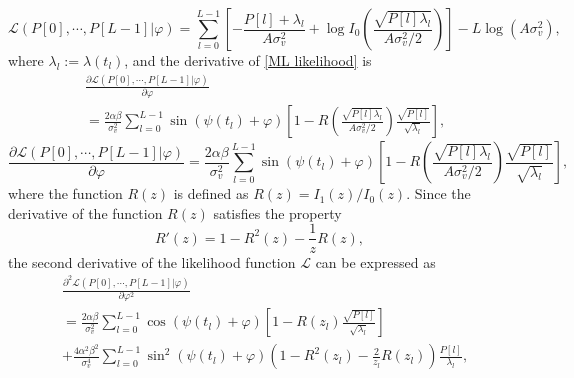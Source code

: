 \documentclass[journal,twocolumn]{IEEEtran}
\theoremstyle{nonumberplain}
\begin{document}
    \else 
        \begin{equation}
            \mathcal{L}(P[0],\cdots,P[L-1] | \varphi) = \sum_{l=0}^{L-1}\left[-\frac{P[l] + \lambda_l}{A\sigma_v^2} + \log I_0\left(\frac{\sqrt{P[l] \lambda_l}}{A\sigma_v^2/2}\right)\right] - L\log(A\sigma_v^2),
            \label{ML likelihood}
        \end{equation}
    \fi
    where $\lambda_l := \lambda(t_l)$, and the derivative of \eqref{ML likelihood} is 
    \ifx\onecol\undefined
        \begin{equation}
            \begin{aligned}
                & \frac{\partial \mathcal{L}(P[0],\cdots,P[L-1] | \varphi)}{\partial \varphi} \\
                &= \frac{2\alpha\beta}{\sigma_v^2}\sum_{l=0}^{L-1}\sin(\psi(t_l)+\varphi) \left[1 - R\left( \frac{\sqrt{P[l]\lambda_l}}{A\sigma_v^2/2} \right) \frac{\sqrt{P[l]}}{\sqrt{\lambda_l}}\right],
            \end{aligned}
            \label{eqn:First Derivative Likelihood}
        \end{equation}
    \else 
        \begin{equation}
            \frac{\partial \mathcal{L}(P[0],\cdots,P[L-1] | \varphi)}{\partial \varphi} = \frac{2\alpha\beta}{\sigma_v^2}\sum_{l=0}^{L-1}\sin(\psi(t_l)+\varphi) \left[1 - R\left( \frac{\sqrt{P[l]\lambda_l}}{A\sigma_v^2/2} \right) \frac{\sqrt{P[l]}}{\sqrt{\lambda_l}}\right],
            \label{eqn:First Derivative Likelihood}
        \end{equation}
    \fi
    where the function $R(z)$ is defined as $R(z) = I_1(z)/I_0(z)$. Since the derivative of the function $R(z)$ satisfies the property \cite{silverman1972special}
    \begin{equation}
        R'(z)=1-R^2(z)-\frac{1}{z}R(z),
        \label{eqn:R function derivative property}
    \end{equation}
    the second derivative of the likelihood function $\mathcal{L}$ can be expressed as
    \ifx\onecol\undefined
        \begin{equation}
            \begin{aligned}
            & \frac{\partial^2 \mathcal{L}(P[0],\cdots,P[L-1] | \varphi)}{\partial \varphi^2} \\
            & =  \frac{2\alpha\beta}{\sigma_v^2} \sum_{l=0}^{L-1}{\cos(\psi(t_l)+\varphi)}\left[1 - R\left(z_l\right) \frac{\sqrt{P[l]}}{\sqrt{\lambda_l}}\right] \\
            & +\frac{4\alpha^2\beta^2}{\sigma_v^4}\sum_{l=0}^{L-1}{\sin^2(\psi(t_l)+\varphi) \left(1-R^2(z_l) -\frac{2}{z_l}R(z_l)\right)\frac{P[l]}{\lambda_l} },\\
            \end{aligned}
            \label{Second Derivative Likelihood}
        \end{equation}
\end{document}
